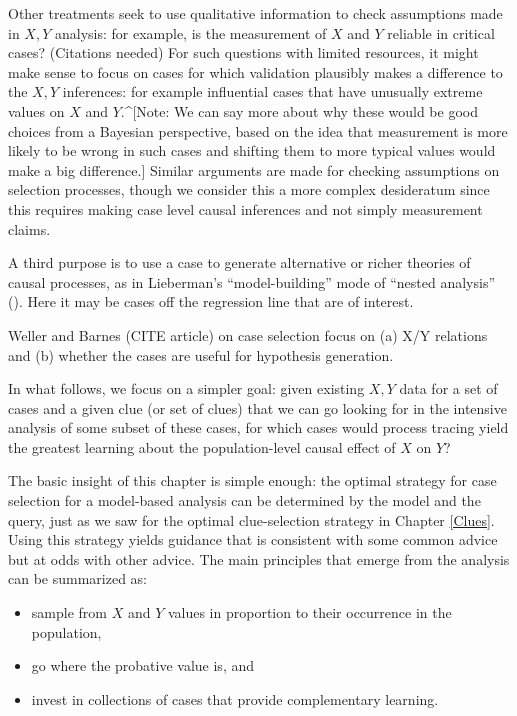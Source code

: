 \documentclass[12pt,]{book}
\providecommand{\tightlist}{%
  \setlength{\itemsep}{0pt}\setlength{\parskip}{0pt}}
\begin{document}
Other treatments seek to use qualitative information to check assumptions made in \(X, Y\) analysis: for example, is the measurement of \(X\) and \(Y\) reliable in critical cases? (Citations needed) For such questions with limited resources, it might make sense to focus on cases for which validation plausibly makes a difference to the \(X,Y\) inferences: for example influential cases that have unusually extreme values on \(X\) and \(Y\).\^{}{[}Note: We can say more about why these would be good choices from a Bayesian perspective, based on the idea that measurement is more likely to be wrong in such cases and shifting them to more typical values would make a big difference.{]} Similar arguments are made for checking assumptions on selection processes, though we consider this a more complex desideratum since this requires making case level causal inferences and not simply measurement claims.

A third purpose is to use a case to generate alternative or richer theories of causal processes, as in Lieberman's ``model-building'' mode of ``nested analysis'' (\citet{Lieberman2005nested}). Here it may be cases off the regression line that are of interest.

Weller and Barnes (CITE article) on case selection focus on (a) X/Y relations and (b) whether the cases are useful for hypothesis generation.

In what follows, we focus on a simpler goal: given existing \(X, Y\) data for a set of cases and a given clue (or set of clues) that we can go looking for in the intensive analysis of some subset of these cases, for which cases would process tracing yield the greatest learning about the population-level causal effect of \(X\) on \(Y\)?

The basic insight of this chapter is simple enough: the optimal strategy for case selection for a model-based analysis can be determined by the model and the query, just as we saw for the optimal clue-selection strategy in Chapter \ref{Clues}. Using this strategy yields guidance that is consistent with some common advice but at odds with other advice. The main principles that emerge from the analysis can be summarized as:

\begin{itemize}
\tightlist
\item
  sample from \(X\) and \(Y\) values in proportion to their occurrence in the population,
\item
  go where the probative value is, and
\item
  invest in collections of cases that provide complementary learning.
\end{itemize}
\end{document}
